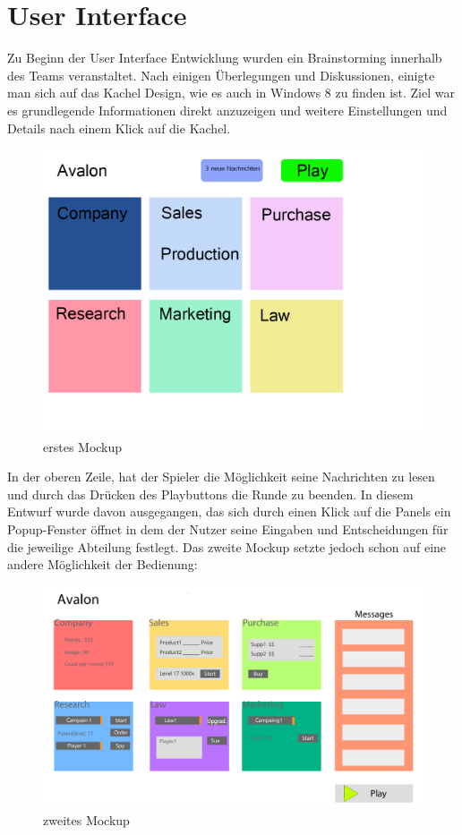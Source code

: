 \chapter{User Interface}
Zu Beginn der User Interface Entwicklung wurden ein Brainstorming innerhalb des Teams veranstaltet. Nach einigen Überlegungen und Diskussionen, einigte man sich auf das Kachel Design, wie es auch in Windows 8 zu finden ist. Ziel war es grundlegende Informationen direkt anzuzeigen und weitere Einstellungen und Details nach einem Klick auf die Kachel.

\begin{figure}[H]
\centering
\includegraphics[width=0.7\linewidth]{../images/mockup1}
\caption{erstes Mockup}
\label{fig:mockup1}
\end{figure}


In der oberen Zeile, hat der Spieler die Möglichkeit seine Nachrichten zu lesen und durch das Drücken des Playbuttons die Runde zu beenden. In diesem Entwurf wurde davon ausgegangen, das sich durch einen Klick auf die Panels ein Popup-Fenster öffnet in dem der Nutzer seine Eingaben und Entscheidungen für die jeweilige Abteilung festlegt.  Das zweite Mockup setzte jedoch schon auf eine andere Möglichkeit der Bedienung:

\begin{figure}[H]
\centering
\includegraphics[width=0.7\linewidth]{../images/mockup2}
\caption{zweites Mockup}
\label{fig:mockup2}
\end{figure}

